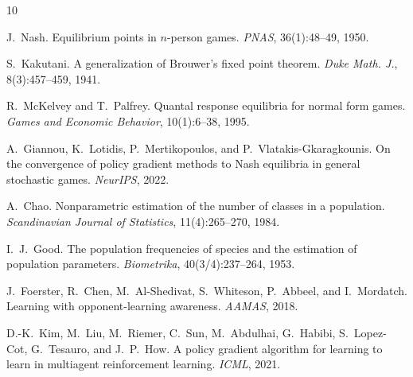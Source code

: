 \documentclass[11pt,a4paper]{article}
\begin{document}

\begin{thebibliography}{10}

J.~Nash. Equilibrium points in $n$-person games. \emph{PNAS}, 36(1):48--49, 1950.

S.~Kakutani. A generalization of Brouwer's fixed point theorem.
\emph{Duke Math. J.}, 8(3):457--459, 1941.

R.~McKelvey and T.~Palfrey. Quantal response equilibria for normal form games.
\emph{Games and Economic Behavior}, 10(1):6--38, 1995.

A.~Giannou, K.~Lotidis, P.~Mertikopoulos, and P.~Vlatakis-Gkaragkounis.
On the convergence of policy gradient methods to Nash equilibria in general
stochastic games. \emph{NeurIPS}, 2022.

A.~Chao. Nonparametric estimation of the number of classes in a population.
\emph{Scandinavian Journal of Statistics}, 11(4):265--270, 1984.

I.~J.~Good. The population frequencies of species and the estimation of
population parameters. \emph{Biometrika}, 40(3/4):237--264, 1953.

J.~Foerster, R.~Chen, M.~Al-Shedivat, S.~Whiteson, P.~Abbeel, and I.~Mordatch.
Learning with opponent-learning awareness. \emph{AAMAS}, 2018.

D.-K.~Kim, M.~Liu, M.~Riemer, C.~Sun, M.~Abdulhai, G.~Habibi,
S.~Lopez-Cot, G.~Tesauro, and J.~P.~How. A policy gradient algorithm
for learning to learn in multiagent reinforcement learning.
\emph{ICML}, 2021.

\end{thebibliography}
\end{document}
